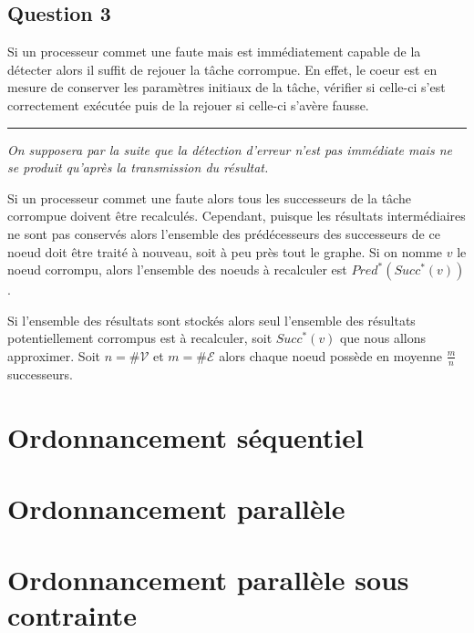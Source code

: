 \documentclass[11pt]{article}
\begin{document}

  \subsection{Question 3}
    Si un processeur commet une faute mais est immédiatement capable de la
    détecter alors il suffit de rejouer la tâche corrompue. En effet, le
    coeur est en mesure de conserver les paramètres initiaux de la tâche,
    vérifier si celle-ci s'est correctement exécutée puis de la rejouer si
    celle-ci s'avère fausse.

    \begin{center}
      \rule{0.5\linewidth}{0.1mm}

      \emph{On supposera par la suite que la détection d'erreur n'est pas
      immédiate mais ne se produit qu'après la transmission du résultat.}
    \end{center}

    Si un processeur commet une faute alors tous les successeurs de la tâche
    corrompue doivent être recalculés. Cependant, puisque les résultats
    intermédiaires ne sont pas conservés alors l'ensemble des prédécesseurs des
    successeurs de ce noeud doit être traité à nouveau, soit à peu près tout le
    graphe.  Si on nomme $v$ le noeud corrompu, alors l'ensemble des noeuds à
    recalculer est $Pred^{*}(Succ^{*}(v))$.

    Si l'ensemble des résultats sont stockés alors seul l'ensemble des résultats
    potentiellement corrompus est à recalculer, soit $Succ^{*}(v)$ que nous
    allons approximer.
    Soit $n = \#\mathcal{V}$ et $m = \#\mathcal{E}$ alors chaque noeud possède
    en moyenne $\frac{m}{n}$ successeurs.

\section{Ordonnancement séquentiel}
\section{Ordonnancement parallèle}
\section{Ordonnancement parallèle sous contrainte}
\end{document}
